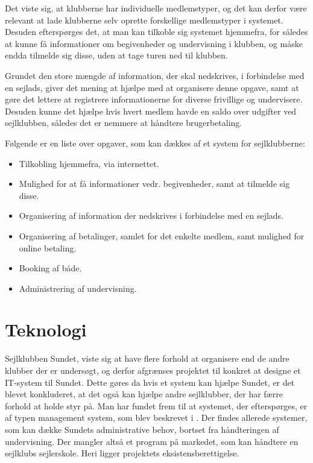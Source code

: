 Det viste sig, at klubberne har individuelle medlemstyper, og det kan derfor være relevant at lade klubberne
selv oprette forskellige medlemstyper i systemet. 
Desuden efterspørges det, at man kan tilkoble sig systemet
hjemmefra, for således at kunne få informationer om begivenheder og undervisning i klubben, og måske endda
tilmelde sig disse, uden at tage turen ned til klubben.

Grundet den store mængde af information, der skal nedskrives, i forbindelse med en sejlads, giver det mening at hjælpe med at organisere denne opgave, samt at gøre det lettere at registrere informationerne for diverse
frivillige og undervisere. 
Desuden kunne det hjælpe hvis hvert medlem havde en saldo over udgifter ved sejlklubben, således det er nemmere at håndtere brugerbetaling.

Følgende er en liste over opgaver, som kan dækkes af et system for sejlklubberne:

\begin{itemize}
  \item Tilkobling hjemmefra, via internettet.
  \item Mulighed for at få informationer vedr. begivenheder, samt at tilmelde sig disse.
  \item Organisering af information der nedskrives i forbindelse med en sejlads. 
  \item Organisering af betalinger, samlet for det enkelte medlem, samt mulighed for online betaling.
  \item Booking af både.
  \item Administrering af undervisning.
\end{itemize}


\section{Teknologi}

Sejlklubben Sundet, viste sig at have flere forhold at organisere end de andre klubber der er undersøgt, og derfor afgrænses projektet til konkret at designe et IT-system til Sundet. 
Dette gøres da hvis et system kan hjælpe Sundet, er det blevet konkluderet, at det også kan hjælpe andre sejlklubber, der har færre forhold at holde styr på.
Man har fundet frem til at systemet, der efterspørges, er af typen management system, som blev beskrevet i .
Der findes allerede systemer, som kan dække Sundets administrative behov, bortset fra håndteringen af undervisning.
Der mangler altså et program på markedet, som kan håndtere en sejlklubs sejlerskole.
Heri ligger projektets eksistensberettigelse.

